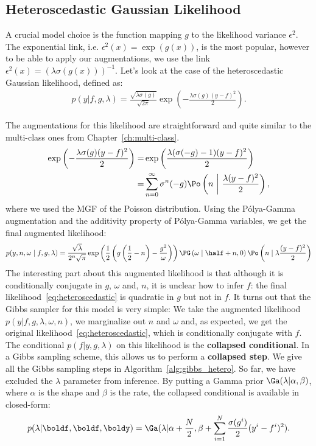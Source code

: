 \subsection{Heteroscedastic Gaussian Likelihood}
\label{sec:hetero_gaussian}
A crucial model choice is the function mapping $g$ to the likelihood variance $\epsilon^2$.
The exponential link, i.e. $\epsilon^2(x) = \exp(g(x))$, is the most popular, however to be able to apply our augmentations, we use the link $\epsilon^2(x) = \left(\lambda \sigma(g(x))\right)^{-1}$.
Let's look at the case of the heteroscedastic Gaussian likelihood, defined as:
\begin{align}
    p(y|f,g,\lambda) = \frac{\sqrt{\lambda \sigma(g)}}{\sqrt{2\pi}}\exp\left(-\frac{\lambda \sigma(g)(y-f)^2}{2}\right).\label{eq:hetero_lik}
\end{align}

The augmentations for this likelihood are straightforward and quite similar to the multi-class ones from Chapter~\ref{ch:multi-class}.
\begin{align}
    \exp\left(-\frac{\lambda\sigma(g)(y-f)^2}{2}\right) =& \exp\left(\frac{\lambda(\sigma(-g) -1)(y-f)^2}{2}\right)\nonumber\\
    =&\sum_{n=0}^\infty \sigma^n(-g)\Po \left(n~\middle|~\frac{\lambda(y-f)^2}{2}\right),\label{eq:aug_poisson}
\end{align}
where we used the \ac{MGF} of the Poisson distribution.
Using the P\'olya-Gamma augmentation and the additivity property of P\'olya-Gamma variables, we get the final augmented likelihood:
\begin{align}
    p(y,n,\omega\mid f,g,\lambda) = \frac{\sqrt{\lambda}}{2^n\sqrt{\pi}}\exp\left(\frac{1}{2}\left(g\left(\frac{1}{2}-n\right) - \frac{g^2}{\omega}\right)\right)\PG \left(\omega \mid \half + n, 0\right) \Po \left(n \mid \lambda\frac{(y-f)^2}{2}\right)\label{eq:heteroscedastic}
\end{align}
The interesting part about this augmented likelihood is that although it is conditionally conjugate in $g$, $\omega$ and, $n$, it is unclear how to infer $f$:
the final likelihood~\eqref{eq:heteroscedastic} is quadratic in $g$ but not in $f$.
It turns out that the Gibbs sampler for this model is very simple:
We take the augmented likelihood $p(y|f,g,\lambda,\omega,n)$, we marginalize out $n$ and $\omega$ and, as expected, we get the original likelihood~\eqref{eq:heteroscedastic}, which is conditionally conjugate with $f$.
The conditional $p(f|y,g,\lambda)$ on this likelihood is the \textbf{collapsed conditional}.
In a Gibbs sampling scheme, this allows us to perform a \textbf{collapsed step}.
We give all the Gibbs sampling steps in Algorithm~\ref{alg:gibbs_hetero}.
So far, we have excluded the $\lambda$ parameter from inference.
By putting a Gamma prior $\Ga(\lambda|\alpha, \beta)$, where $\alpha$ is the shape and $\beta$ is the rate, the collapsed conditional is available in closed-form:
\begin{align*}
    p(\lambda|\boldf, \boldf, \boldy) = \Ga(\lambda| \alpha + \frac{N}{2}, \beta + \sum_{i=1}^N \frac{\sigma(g^i)}{2}(y^i - f^i)^2).
\end{align*}


